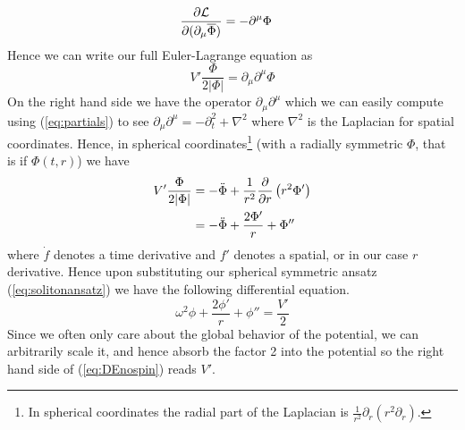 \begin{align}
\pdv{\mathcal{L}}{(\partial_\mu\overline{\Phi})} & = -\partial^\mu\Phi
\end{align}
Hence we can write our full Euler-Lagrange equation as
\begin{equation}
V'\frac{\Phi}{2|\Phi|} = \partial_\mu\partial^\mu\Phi
\end{equation}
On the right hand side we have the operator $\partial_\mu\partial^\mu$ which we can easily compute using (\ref{eq:partials}) to see $\partial_\mu\partial^\mu = -\partial_t^2 + \nabla^2$ where $\nabla^2$ is the Laplacian for spatial coordinates. Hence, in spherical coordinates\footnote{In spherical coordinates the radial part of the Laplacian is $\frac{1}{r^2}\partial_r\left(r^2\partial_r\right)$.} (with a radially symmetric $\Phi$, that is if $\Phi(t,r)$) we have
\begin{align}
V'\frac{\Phi}{2|\Phi|} & = -\ddot{\Phi} + \frac{1}{r^2}\pdv{r}\left(r^2\Phi'\right) \\ & = -\ddot{\Phi} + \frac{2\Phi'}{r} + \Phi''
\end{align}
where $\dot{f}$ denotes a time derivative and $f'$ denotes a spatial, or in our case $r$ derivative. Hence upon substituting our spherical symmetric ansatz (\ref{eq:solitonansatz}) we have the following differential equation.
\begin{equation}\label{eq:DEnospin}
\omega^2\phi + \frac{2\phi'}{r} + \phi'' = \frac{V'}{2}
\end{equation}
Since we often only care about the global behavior of the potential, we can arbitrarily scale it, and hence absorb the factor 2 into the potential so the right hand side of (\ref{eq:DEnospin}) reads $V'$.

